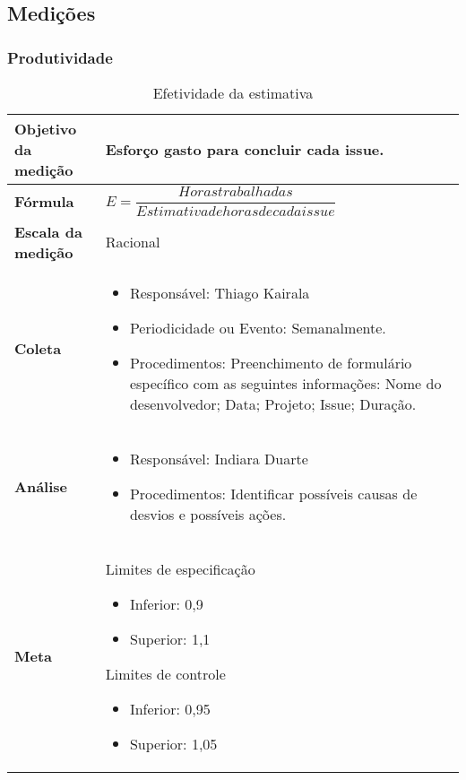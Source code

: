 \subsection{Medições}

\subsubsection{Produtividade}

\begin{table}[H]
\centering
\begin{tabular}{|p{4cm}|p{7cm}|}
\hline
	\textbf{Objetivo da medição} &
	Esforço gasto para concluir cada issue.
	\\ \hline
	\textbf{Fórmula} &
	$E = \dfrac{Horas trabalhadas}{Estimativa de horas de cada issue}$
	\\ \hline
	\textbf{Escala da medição} &
	Racional
	\\ \hline
	\textbf{Coleta} &
	\begin{itemize}
		\item{Responsável: Thiago Kairala}
		\item{Periodicidade ou Evento: Semanalmente.}
		\item{Procedimentos: Preenchimento de formulário específico com as seguintes informações: Nome do desenvolvedor; Data; Projeto; Issue; Duração.}
	\end{itemize}
	\\ \hline
	\textbf{Análise} &
	\begin{itemize}
		\item Responsável: Indiara Duarte
		\item Procedimentos: Identificar possíveis causas de desvios e possíveis ações.
	\end{itemize}
	\\ \hline
	\textbf{Meta} &
	Limites de especificação
		\begin{itemize}
			\item Inferior: 0,9
			\item Superior: 1,1
		\end{itemize}
	Limites de controle
		\begin{itemize}
			\item Inferior: 0,95
			\item Superior: 1,05
		\end{itemize}
  \\ \hline
\end{tabular}
\caption{Efetividade da estimativa}
\label{tab:efetividade_estimativa}
\end{table}

